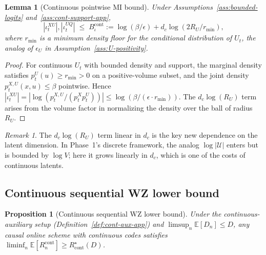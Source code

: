 \documentclass[11pt]{article}
\newcommand{\E}{\mathbb{E}}
\theoremstyle{plain}
\newtheorem{lemma}[theorem]{Lemma}
\newtheorem{proposition}[theorem]{Proposition}
\theoremstyle{definition}
\theoremstyle{remark}
\newtheorem{remark}[theorem]{Remark}
\begin{document}
\begin{lemma}[Continuous pointwise MI bound]\label{lem:cont-pmi-app}
Under Assumptions~\ref{ass:bounded-logits} and~\ref{ass:cont-support-app},
\[
|\iota_t^{XU}|, |\iota_t^{UQ}|
\;\leq\;
B_\iota^{\mathrm{cont}}
:= \log(\beta/\epsilon) + d_c \log(2 R_U / r_{\min}),
\]
where $r_{\min}$ is a minimum density floor for the conditional
distribution of $U_t$, the analog of $\epsilon_U$ in
Assumption~\ref{ass:U-positivity}.
\end{lemma}

\begin{proof}
For continuous $U_t$ with bounded density and support, the marginal
density satisfies $p_t^U(u) \geq r_{\min} > 0$ on a positive-volume
subset, and the joint density $p_t^{X,U}(x, u) \leq \beta$ pointwise.
Hence $|\iota_t^{XU}| = |\log(p_t^{X,U}/(p_t^X p_t^U))|
\leq \log(\beta/(\epsilon \cdot r_{\min}))$.
The $d_c \log(R_U)$ term arises from the volume factor
in normalizing the density over the ball of radius $R_U$.
\end{proof}

\begin{remark}
The $d_c \log(R_U)$ term linear in $d_c$ is the key new dependence on
the latent dimension. In Phase~1's discrete framework, the analog
$\log|\mathcal{U}|$ enters but is bounded by $\log V$; here it grows
linearly in $d_c$, which is one of the costs of continuous latents.
\end{remark}

\subsection{Continuous sequential WZ lower bound}\label{app:cont-asym}

\begin{proposition}[Continuous sequential WZ lower bound]
\label{prop:cont-asym}
Under the continuous-auxiliary setup
(Definition~\ref{def:cont-aux-app}) and
$\limsup_n \E[D_n] \leq D$, any causal online scheme with
continuous codes satisfies
$\liminf_n \E[R_n^{\mathrm{cont}}] \geq R^\star_{\mathrm{cont}}(D)$.
\end{proposition}
\end{document}
